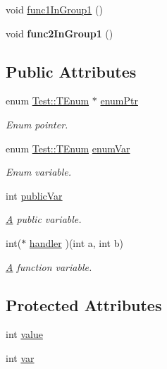 {\bf }\par
\begin{DoxyCompactItemize}
\item 
void \hyperlink{classTest_a63260e6eb6efa149aecf14f86c840c0b}{func1\-In\-Group1} ()
\item 
\hypertarget{classTest_a489fece588ea476e504db5177a157060}{void {\bfseries func2\-In\-Group1} ()}\label{classTest_a489fece588ea476e504db5177a157060}

\end{DoxyCompactItemize}

\subsection*{Public Attributes}
\begin{DoxyCompactItemize}
\item 
enum \hyperlink{classTest_ad8d13fe56b896633273087859b89a1a3}{Test\-::\-T\-Enum} $\ast$ \hyperlink{classTest_a8ee00d5158f7778385133989b5527742}{enum\-Ptr}
\begin{DoxyCompactList}\small\item\em Enum pointer. \end{DoxyCompactList}\item 
enum \hyperlink{classTest_ad8d13fe56b896633273087859b89a1a3}{Test\-::\-T\-Enum} \hyperlink{classTest_a13429658c8d90928b16ec109e32f88b5}{enum\-Var}
\begin{DoxyCompactList}\small\item\em Enum variable. \end{DoxyCompactList}\item 
int \hyperlink{classTest_aba22fd8dcb6ca747e2266fadaf5bc383}{public\-Var}
\begin{DoxyCompactList}\small\item\em \hyperlink{classA}{A} public variable. \end{DoxyCompactList}\item 
int($\ast$ \hyperlink{classTest_a2ce50e60d16f5071772c6acde08181bd}{handler} )(int a, int b)
\begin{DoxyCompactList}\small\item\em \hyperlink{classA}{A} function variable. \end{DoxyCompactList}\end{DoxyCompactItemize}
\subsection*{Protected Attributes}
\begin{DoxyCompactItemize}
\item 
int \hyperlink{classTest_aefcbb7ead19f2c28a71a3a3f26cef6cb}{value}
\item 
int \hyperlink{classTest_ae75d55c8cf6390227d51c0965a4de296}{var}
\end{DoxyCompactItemize}
